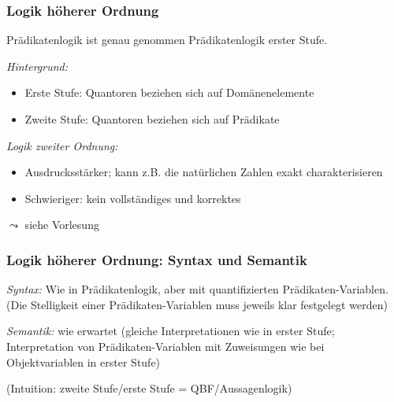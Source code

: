 \documentclass[aspectratio=1610,onlymath]{beamer}
\begin{document}
\begin{frame}\frametitle{Logik höherer Ordnung}

Prädikatenlogik ist genau genommen \alert{Prädikatenlogik erster Stufe}.
\bigskip

\emph{Hintergrund:}
\begin{itemize}
\item Erste Stufe: Quantoren beziehen sich auf Domänenelemente\smallskip

\item Zweite Stufe: Quantoren beziehen sich auf Prädikate\smallskip

\end{itemize}\bigskip

\emph{Logik zweiter Ordnung:}
\begin{itemize}
\item Ausdrucksstärker; kann z.B. die natürlichen Zahlen exakt charakterisieren
\item Schwieriger: kein vollständiges und korrektes 
\end{itemize}

$\leadsto$ siehe Vorlesung 

\end{frame}

\begin{frame}\frametitle{Logik höherer Ordnung: Syntax und Semantik}

\emph{Syntax:} Wie in Prädikatenlogik, aber mit quantifizierten Prädikaten-Variablen.\\
\textcolor{devilscss}{(Die Stelligkeit einer Prädikaten-Variablen muss jeweils klar festgelegt werden)}\medskip

\bigskip\pause

\emph{Semantik:} wie erwartet (gleiche Interpretationen wie in erster Stufe; Interpretation von Prädikaten-Variablen mit Zuweisungen wie bei Objektvariablen in erster Stufe)\medskip

\textcolor{devilscss}{(Intuition: zweite Stufe/erste Stufe = QBF/Aussagenlogik)}

\end{frame}
\end{document}
